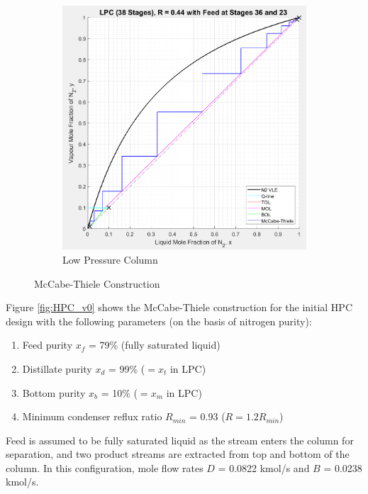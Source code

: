 \documentclass[11pt,oneside]{article}
\begin{document}
\begin{figure}[H]
\begin{subfigure}{0.49\textwidth}
                \includegraphics[width=\linewidth]{LPC_v0.jpeg}
                \caption{Low Pressure Column}
                \label{fig:LPC_v0}
            \end{subfigure}
            \caption{McCabe-Thiele Construction}                        \label{fig:mccabe_v0}
        \end{figure}
        \noindent Figure \ref{fig:HPC_v0} shows the McCabe-Thiele construction for the initial HPC design with the following parameters (on the basis of nitrogen purity):
        \begin{enumerate}
            \item Feed purity $x_f$ = 79\% (fully saturated liquid)
            \item Distillate purity $x_d$ = 99\% ($=x_t$ in LPC)
            \item Bottom purity $x_b$ = 10\% ($=x_m$ in LPC)
            \item Minimum condenser reflux ratio $R_{min}$ = 0.93 ($R = 1.2R_{min}$)
        \end{enumerate}
        Feed is assumed to be fully saturated liquid as the stream enters the column for separation, and two product streams are extracted from top and bottom of the column. In this configuration, mole flow rates $D$ = 0.0822 kmol/s and $B$ = 0.0238 kmol/s. \\
\end{document}
